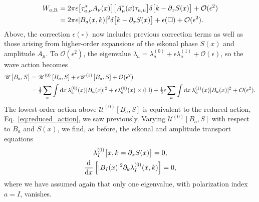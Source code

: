 %
\begin{equation}
  \begin{aligned}
    W_{a,\text{R}} &= 2\pi \epsilon\big[\tau_{a,\nu}^{*} A_{\nu}(x)\big]\big[A^{*}_{\mu}(x)\tau_{a,\mu}\big]\delta\big[k - \partial_{x}S(x)\big] + \mathcal{O}(\epsilon^{2})\\
                   &= 2\pi\epsilon \abs{B_{a}(x, k)}^{2}\delta\big[k - \partial_{x}S(x)\big] + \epsilon(\square) + \mathcal{O}(\epsilon^{2}).
  \end{aligned}
\end{equation}
%
Above, the correction $\epsilon(\square)$ now includes previous correction terms as well as those arising from higher-order expansions of the eikonal phase $S(x)$ and amplitude $A_{\mu}$.
To $\mathcal{O}(\epsilon^{2})$, the eigenvalue $\lambda_{a} = \lambda_{a}^{(0)} + \epsilon\lambda_{a}^{(1)} + \mathcal{O}(\epsilon)$, so the wave action becomes
%
\begin{equation}
  \begin{aligned}
    \mathscr{U}\big[B_{a}, S\big] &= \mathscr{U}^{(0)}\left[B_{a}, S\right] + \epsilon\mathscr{U}^{(1)}\left[B_{a}, S\right] + \mathcal{O}(\epsilon^{2})\\
                                  &= \tfrac{1}{2} \sum_{a} \int \dd{x}\, \lambda_{a}^{(0)}(x)\abs{B_{a}(x)}^{2} + \epsilon\lambda_{a}^{(0)}(x)\times(\square) + \tfrac{1}{2}\epsilon\sum_{a}\int\dd{x}\,\lambda_{a}^{(1)}(x)\abs{B_{a}(x)}^{2} + \mathcal{O}(\epsilon^{2}).
  \end{aligned}
  \label{eq:action_ho}
\end{equation}
%
The lowest-order action above $\mathscr{U}^{(0)}[B_{a}, S]$ is equivalent to the reduced action, Eq.~\eqref{eq:reduced_action}, we saw previously.
Varying $\mathscr{U}^{(0)}[B_{a}, S]$ with respect to $B_{a}$ and $S(x)$, we find, as before, the eikonal and amplitude transport equations
%
\begin{equation}
  \begin{gathered}
    \lambda_{I}^{(0)}\big[x, k=\partial_{x}S(x)\big] = 0,\\
\frac{\dd}{\dd{x}}\left[\abs{B_{I}(x)}^{2}\partial_{k}\lambda^{(0)}_{I}(x, k)\right] = 0,
  \end{gathered}
\end{equation}
%
where we have assumed again that only one eigenvalue, with polarization index $a = I$, vanishes.

